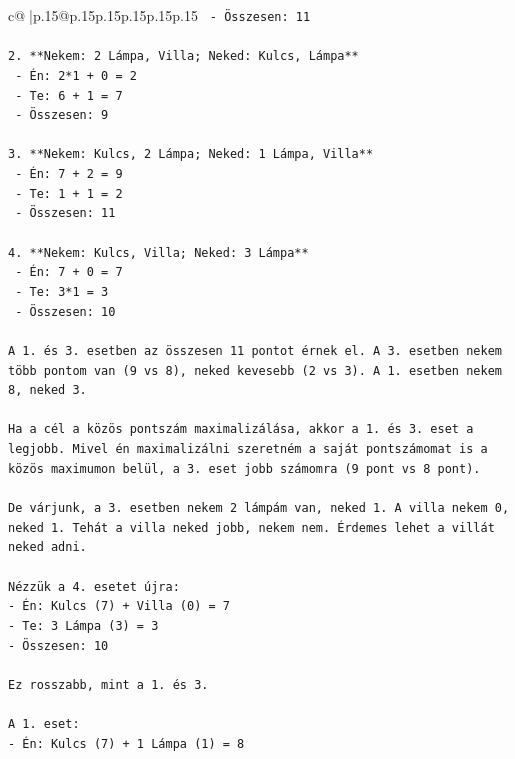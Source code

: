 \documentclass{article}
\begin{document}
{\begin{supertabular}{c@{$\;$}|p{.15\linewidth}@{}p{.15\linewidth}p{.15\linewidth}p{.15\linewidth}p{.15\linewidth}p{.15\linewidth}}
{{{\texttt{   {-} Összesen: 11} \\
\\ 
\texttt{2. **Nekem: 2 Lámpa, Villa; Neked: Kulcs, Lámpa**} \\
\texttt{   {-} Én: 2*1 + 0 = 2} \\
\texttt{   {-} Te: 6 + 1 = 7} \\
\texttt{   {-} Összesen: 9} \\
\\ 
\texttt{3. **Nekem: Kulcs, 2 Lámpa; Neked: 1 Lámpa, Villa**} \\
\texttt{   {-} Én: 7 + 2 = 9} \\
\texttt{   {-} Te: 1 + 1 = 2} \\
\texttt{   {-} Összesen: 11} \\
\\ 
\texttt{4. **Nekem: Kulcs, Villa; Neked: 3 Lámpa**} \\
\texttt{   {-} Én: 7 + 0 = 7} \\
\texttt{   {-} Te: 3*1 = 3} \\
\texttt{   {-} Összesen: 10} \\
\\ 
\texttt{A 1. és 3. esetben az összesen 11 pontot érnek el. A 3. esetben nekem több pontom van (9 vs 8), neked kevesebb (2 vs 3). A 1. esetben nekem 8, neked 3.} \\
\\ 
\texttt{Ha a cél a közös pontszám maximalizálása, akkor a 1. és 3. eset a legjobb. Mivel én maximalizálni szeretném a saját pontszámomat is a közös maximumon belül, a 3. eset jobb számomra (9 pont vs 8 pont).} \\
\\ 
\texttt{De várjunk, a 3. esetben nekem 2 lámpám van, neked 1. A villa nekem 0, neked 1. Tehát a villa neked jobb, nekem nem. Érdemes lehet a villát neked adni.} \\
\\ 
\texttt{Nézzük a 4. esetet újra:} \\
\texttt{{-} Én: Kulcs (7) + Villa (0) = 7} \\
\texttt{{-} Te: 3 Lámpa (3) = 3} \\
\texttt{{-} Összesen: 10} \\
\\ 
\texttt{Ez rosszabb, mint a 1. és 3.} \\
\\ 
\texttt{A 1. eset:} \\
\texttt{{-} Én: Kulcs (7) + 1 Lámpa (1) = 8} \\
}}}
\end{supertabular}}
\end{document}
